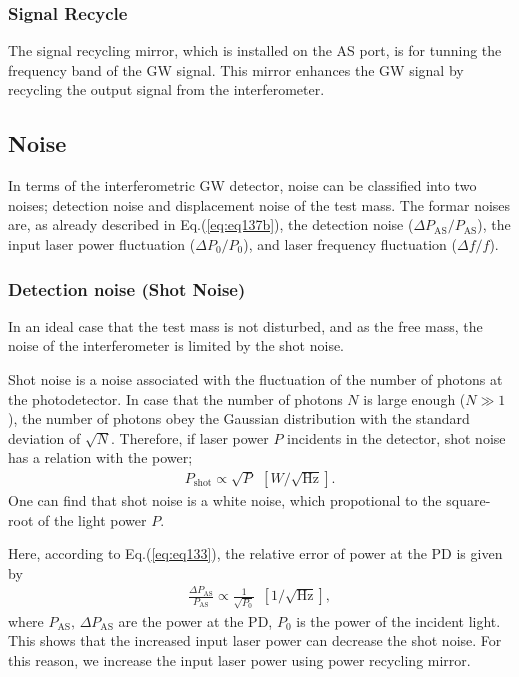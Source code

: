 \subsubsection{Signal Recycle}
The signal recycling mirror, which is installed on the AS port, is for tunning the frequency band of the GW signal. This mirror enhances the GW signal by recycling the output signal from the interferometer.

\subsection{Noise}
In terms of the interferometric GW detector, noise can be classified into two noises; detection noise and displacement noise of the test mass. The formar noises are, as already described in Eq.(\ref{eq:eq137b}), the detection noise  ($\Delta{P_{\mathrm{AS}}}/P_{\mathrm{AS}}$), the input laser power fluctuation  ($\Delta{P_0}/P_0$), and laser frequency fluctuation ($\Delta{f}/f$).

\subsubsection{Detection noise (Shot Noise)}
In an ideal case that the test mass is not disturbed, and as the free mass, the noise of the interferometer is limited by the shot noise.

Shot noise is a noise associated with the fluctuation of the number of photons at the photodetector. In case that the number of photons $N$ is large enough ($N\gg1$), the number of photons obey the Gaussian distribution with the standard deviation of $\sqrt{N}$. Therefore, if laser power $P$ incidents in the detector, shot noise has a relation with the power;
\begin{eqnarray}
  P_{\mathrm{shot}} \propto \sqrt{P}\ \ [W/\sqrt{\mathrm{Hz}}].  \label{eq:eq136}
\end{eqnarray}
One can find that shot noise is a white noise, which propotional to the square-root of the light power $P$.

Here, according to Eq.(\ref{eq:eq133}), the relative error of power at the PD is given by 
\begin{eqnarray}
  \frac{\Delta P_{\mathrm{AS}}}{P_{\mathrm{AS}}}  \propto \frac{1}{\sqrt{P_{\mathrm{0}}}}\ \ [1/\sqrt{\mathrm{Hz}}],  \label{eq:eq136}
\end{eqnarray}
where $P_{\mathrm{AS}},\,\Delta P_{\mathrm{AS}}$ are the power at the PD, $P_0$ is the power of the incident light. This shows that the increased input laser power can decrease the shot noise. For this reason, we increase the input laser power using power recycling mirror.

